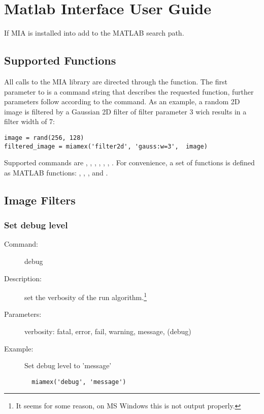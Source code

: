 \section{Matlab Interface User Guide}

If MIA is installed into  add  to the MATLAB search path. 
 

\subsection{Supported Functions}

All calls to the MIA library are directed through the \miamex function.
The first parameter to \miamex is a command string that describes the requested function, further parameters follow according to the command.
As an example, a random 2D image is filtered by a Gaussian 2D filter of filter parameter 3 wich results in a filter width of 7:

\lstset{language=matlab}
\begin{lstlisting}
image = rand(256, 128) 
filtered_image = miamex('filter2d', 'gauss:w=3',  image) 
\end{lstlisting}

\noindent 
Supported commands are  ,  , , , , , . 
For convenience, a set of functions is defined as MATLAB functions:  , , ,  and . 


\subsection{Image Filters}

\subsubsection*{Set debug level}

\begin{description}
\item [Command:] debug
\item [Description:] set the verbosity of the run algorithm.\footnote{%
	It seems for some reason, on MS Windows this is not output properly. 
}
\item [Parameters:] verbosity: fatal, error, fail, warning, message, (debug)
\item [Example:] Set debug level to 'message'
\begin{lstlisting}
  miamex('debug', 'message')
\end{lstlisting}
\end{description}

